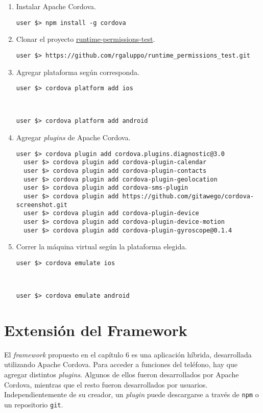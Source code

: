 \begin{enumerate}
    \item Instalar Apache Cordova.
        \begin{lstlisting}[style=DOS]
  user $> npm install -g cordova
        \end{lstlisting}
    \item Clonar el proyecto \href{https://github.com/rgaluppo/runtime_permissions_test}{runtime-permissions-test}.
    \begin{lstlisting}[style=DOS]
  user $> https://github.com/rgaluppo/runtime_permissions_test.git
  \end{lstlisting}
    \item Agregar plataforma según corresponda.
        \begin{lstlisting}[style=DOS]
  user $> cordova platform add ios
        \end{lstlisting}\\
        \begin{lstlisting}[style=DOS]
  user $> cordova platform add android
        \end{lstlisting}
    \item Agregar \emph{plugins} de Apache Cordova.
        \begin{lstlisting}[style=DOS]
  user $> cordova plugin add cordova.plugins.diagnostic@3.0
  user $> cordova plugin add cordova-plugin-calendar
  user $> cordova plugin add cordova-plugin-contacts
  user $> cordova plugin add cordova-plugin-geolocation
  user $> cordova plugin add cordova-sms-plugin
  user $> cordova plugin add https://github.com/gitawego/cordova-screenshot.git
  user $> cordova plugin add cordova-plugin-device
  user $> cordova plugin add cordova-plugin-device-motion
  user $> cordova plugin add cordova-plugin-gyroscope@0.1.4
        \end{lstlisting}
    \item Correr la máquina virtual según la plataforma elegida.
        \begin{lstlisting}[style=DOS]
  user $> cordova emulate ios
        \end{lstlisting}\\
        \begin{lstlisting}[style=DOS]
  user $> cordova emulate android
        \end{lstlisting}
\end{enumerate}
\section*{Extensión del Framework}
El \emph{framework} propuesto en el capítulo 6 es una aplicación híbrida, desarrollada utilizando Apache Cordova. Para acceder a funciones del teléfono, hay que agregar distintos \emph{plugins}. Algunos de ellos fueron desarrollados por Apache Cordova, mientras que el resto fueron desarrollados por usuarios. Independientemente de su creador, un \emph{plugin} puede descargarse a través de \texttt{npm} o un repositorio \texttt{git}.\\

